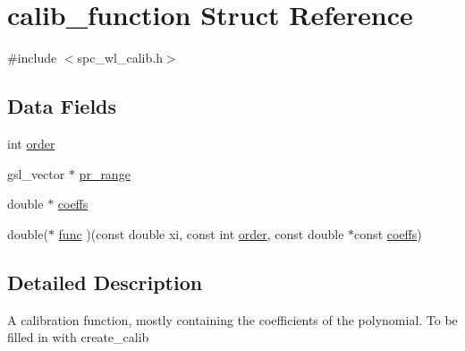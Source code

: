 \hypertarget{structcalib__function}{
\section{calib\_\-function Struct Reference}
\label{structcalib__function}
}


{\ttfamily \#include $<$spc\_\-wl\_\-calib.h$>$}\subsection*{Data Fields}
\begin{DoxyCompactItemize}
\item 
int \hyperlink{structcalib__function_a0c2f4bb6aac5dbd2ce276ed8bee280da}{order}
\item 
gsl\_\-vector $\ast$ \hyperlink{structcalib__function_a585ddafa8bb9e1ac0b7a3da3410b5f80}{pr\_\-range}
\item 
double $\ast$ \hyperlink{structcalib__function_af6161163d6abff34648d027533dbc89e}{coeffs}
\item 
double($\ast$ \hyperlink{structcalib__function_af3b6ef00cf4dfcfc75e8f129c555d99f}{func} )(const double xi, const int \hyperlink{structcalib__function_a0c2f4bb6aac5dbd2ce276ed8bee280da}{order}, const double $\ast$const \hyperlink{structcalib__function_af6161163d6abff34648d027533dbc89e}{coeffs})
\end{DoxyCompactItemize}


\subsection{Detailed Description}
A calibration function, mostly containing the coefficients of the polynomial. To be filled in with create\_\-calib 

